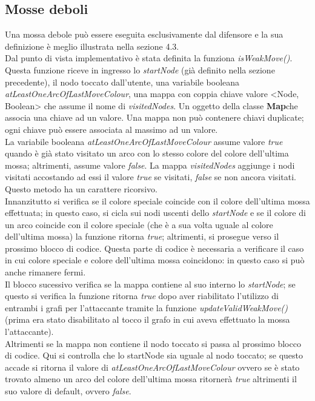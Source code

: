 \documentclass[a4paper,11pt,twoside,openright]{report}
\begin{document}
\subsection{Mosse deboli}
Una mossa debole può essere eseguita esclusivamente dal difensore e la sua definizione è meglio illustrata nella sezione 4.3.\\
Dal punto di vista implementativo è stata definita la funziona \textit{isWeakMove()}. Questa funzione riceve in ingresso lo \textit{startNode} (già definito nella sezione precedente), il nodo toccato dall'utente, una variabile booleana \textit{atLeastOneArcOfLastMoveColour}, una mappa con coppia chiave valore <Node, Boolean> che assume il nome di \textit{visitedNodes}. Un oggetto della classe \textbf{Map}\cite{14}che associa una chiave ad un valore. Una mappa non può contenere chiavi duplicate; ogni chiave può essere associata al massimo ad un valore.\\
La variabile booleana \textit{atLeastOneArcOfLastMoveColour} assume valore \textit{true} quando è già stato visitato un arco con lo stesso colore del colore dell'ultima mossa; altrimenti, assume valore \textit{false}. La mappa \textit{visitedNodes} aggiunge i nodi visitati accostando ad essi il valore \textit{true} se visitati, \textit{false} se non ancora visitati.\\
Questo metodo ha un carattere ricorsivo.\\
Innanzitutto si verifica se il colore speciale coincide con il colore dell'ultima mossa effettuata; in questo caso, si cicla sui nodi uscenti dello \textit{startNode} e se il colore di un arco coincide con il colore speciale (che è a sua volta uguale al colore dell'ultima mossa) la funzione ritorna \textit{true}; altrimenti, si prosegue verso il prossimo blocco di codice. Questa parte di codice è necessaria a verificare il caso in cui colore speciale e colore dell'ultima mossa coincidono: in questo caso si può anche rimanere fermi.\\
Il blocco sucessivo verifica se la mappa contiene al suo interno lo \textit{startNode}; se questo si verifica la funzione ritorna \textit{true} dopo aver riabilitato l'utilizzo di entrambi i grafi per l'attaccante tramite la funzione \textit{updateValidWeakMove()} (prima era stato disabilitato al tocco il grafo in cui aveva effettuato la mossa l'attaccante).\\
Altrimenti se la mappa non contiene il nodo toccato si passa al prossimo blocco di codice. Qui si controlla che lo startNode sia uguale al nodo toccato; se questo accade si ritorna il valore di \textit{atLeastOneArcOfLastMoveColour} ovvero se è stato trovato almeno un arco del colore dell'ultima mossa ritornerà \textit{true} altrimenti il suo valore di default, ovvero \textit{false}.
\end{document}
